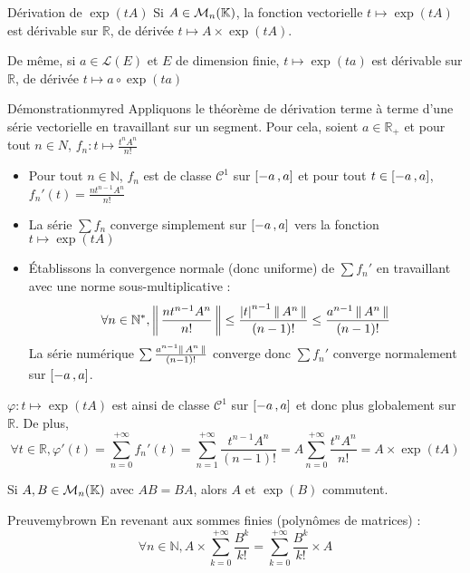     \begin{theo}{Dérivation de $\exp(tA)$}{}
        Si $A \in \mathcal{M}_{n}(\mathbb{K})$, la fonction vectorielle $t \longmapsto \exp(tA)$ est dérivable sur $\mathbb{R}$, de dérivée $t \longmapsto A \times \exp(tA)$.
    \end{theo}

    De même, si $a \in \mathcal{L}(E)$ et $E$ de dimension finie, $t \longmapsto \exp(ta)$ est dérivable sur $\mathbb{R}$, de dérivée $t \longmapsto a \circ \exp(ta)$

    \begin{demo}{Démonstration}{myred}
        Appliquons le théorème de dérivation terme à terme d’une série vectorielle en travaillant sur un segment. Pour cela, soient $a \in \mathbb{R}_+$ et pour tout $n \in N$, $f_n : t \mapsto \frac{t^n A^n}{n!}$
        \begin{itemize}
            \item Pour tout $n \in \mathbb{N}$, $f_n$ est de classe $\mathcal{C}^1$ sur $\left[ -a \, , a \right]$ et pour tout $t \in \left[ -a \, , a \right]$, $f_n'(t) = \frac{n t^{n-1} A^n}{n!}$
            \item La série $\sum f_n$ converge simplement sur $\left[ -a \, , a \right]$ vers la fonction $t \longmapsto \exp(tA)$
            \item Établissons la convergence normale (donc uniforme) de $\sum f_n'$ en travaillant avec une norme sous-multiplicative : 
            \[ \forall n \in \mathbb{N}^*, \left\lVert\,\frac{n t^{n-1} A^n}{n!}\,\right\rVert \leq \frac{\left\lvert t\right\rvert^{n-1} \left\lVert\,A^n\,\right\rVert}{(n-1)!} \leq \frac{a^{n-1} \left\lVert\,A^n\,\right\rVert}{(n-1)!} \] 
            La série numérique $\sum \frac{a^{n-1} \left\lVert\,A^n\,\right\rVert}{(n-1)!}$ converge donc $\sum f_n'$ converge normalement sur $\left[ -a \, , a \right]$.
        \end{itemize}
        $\varphi : t \mapsto \exp(tA)$ est ainsi de classe $\mathcal{C}^1$ sur $\left[ -a \, , a \right]$ et donc plus globalement sur $\mathbb{R}$. De plus, 
        \[ \forall t \in \mathbb{R}, \varphi' (t) = \sum\limits_{n=0}^{+\infty} f_n'(t) = \sum\limits_{n=1}^{+\infty} \frac{t^{n-1} A^n}{(n-1)!} = A \sum\limits_{n=0}^{+\infty} \frac{t^n A^n}{n!} = A \times \exp(tA) \]
    \end{demo}

    \begin{lem}{}{}
        Si $A,B \in \mathcal{M}_{n}(\mathbb{K})$ avec $AB = BA$, alors $A$ et $\exp(B)$ commutent.
    \end{lem}

    \begin{demo}{Preuve}{mybrown}
        En revenant aux sommes finies (polynômes de matrices) : 
        \[ \forall n \in \mathbb{N}, A \times \sum\limits_{k=0}^{+\infty} \frac{B^k}{k!} = \sum\limits_{k=0}^{+\infty} \frac{B^k}{k!} \times A \]
    \end{demo}

